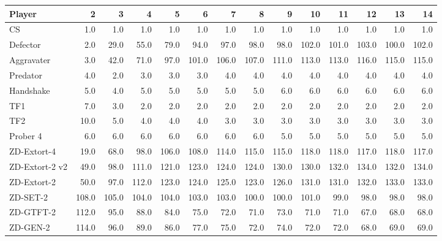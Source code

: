 \begin{tabular}{lrrrrrrrrrrrrr}
\toprule
         Player &      2 &      3 &      4 &      5 &      6 &      7 &      8 &      9 &     10 &     11 &     12 &     13 &     14 \\
\midrule
             CS &    1.0 &    1.0 &    1.0 &    1.0 &    1.0 &    1.0 &    1.0 &    1.0 &    1.0 &    1.0 &    1.0 &    1.0 &    1.0 \\
       Defector &    2.0 &   29.0 &   55.0 &   79.0 &   94.0 &   97.0 &   98.0 &   98.0 &  102.0 &  101.0 &  103.0 &  100.0 &  102.0 \\
     Aggravater &    3.0 &   42.0 &   71.0 &   97.0 &  101.0 &  106.0 &  107.0 &  111.0 &  113.0 &  113.0 &  116.0 &  115.0 &  115.0 \\
       Predator &    4.0 &    2.0 &    3.0 &    3.0 &    3.0 &    4.0 &    4.0 &    4.0 &    4.0 &    4.0 &    4.0 &    4.0 &    4.0 \\
      Handshake &    5.0 &    4.0 &    5.0 &    5.0 &    5.0 &    5.0 &    5.0 &    6.0 &    6.0 &    6.0 &    6.0 &    6.0 &    6.0 \\
            TF1 &    7.0 &    3.0 &    2.0 &    2.0 &    2.0 &    2.0 &    2.0 &    2.0 &    2.0 &    2.0 &    2.0 &    2.0 &    2.0 \\
            TF2 &   10.0 &    5.0 &    4.0 &    4.0 &    4.0 &    3.0 &    3.0 &    3.0 &    3.0 &    3.0 &    3.0 &    3.0 &    3.0 \\
       Prober 4 &    6.0 &    6.0 &    6.0 &    6.0 &    6.0 &    6.0 &    6.0 &    5.0 &    5.0 &    5.0 &    5.0 &    5.0 &    5.0 \\
    ZD-Extort-4 &   19.0 &   68.0 &   98.0 &  106.0 &  108.0 &  114.0 &  115.0 &  115.0 &  118.0 &  118.0 &  117.0 &  118.0 &  117.0 \\
 ZD-Extort-2 v2 &   49.0 &   98.0 &  111.0 &  121.0 &  123.0 &  124.0 &  124.0 &  130.0 &  130.0 &  132.0 &  134.0 &  132.0 &  134.0 \\
    ZD-Extort-2 &   50.0 &   97.0 &  112.0 &  123.0 &  124.0 &  125.0 &  123.0 &  126.0 &  131.0 &  131.0 &  132.0 &  133.0 &  133.0 \\
       ZD-SET-2 &  108.0 &  105.0 &  104.0 &  104.0 &  103.0 &  103.0 &  100.0 &  100.0 &  101.0 &   99.0 &   98.0 &   98.0 &   98.0 \\
      ZD-GTFT-2 &  112.0 &   95.0 &   88.0 &   84.0 &   75.0 &   72.0 &   71.0 &   73.0 &   71.0 &   71.0 &   67.0 &   68.0 &   68.0 \\
       ZD-GEN-2 &  114.0 &   96.0 &   89.0 &   86.0 &   77.0 &   75.0 &   72.0 &   74.0 &   72.0 &   72.0 &   68.0 &   69.0 &   69.0 \\
\bottomrule
\end{tabular}
